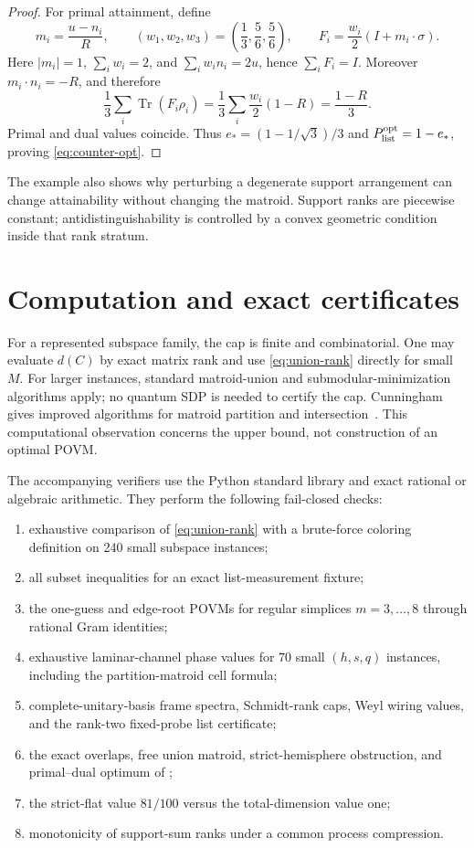 \documentclass[11pt]{article}
\theoremstyle{definition}
\theoremstyle{remark}
\newcommand{\Tr}{\operatorname{Tr}}
\begin{document}
\begin{proof}
For primal attainment, define
\[
 m_i=\frac{u-n_i}{R},\qquad
 (w_1,w_2,w_3)=\left(\frac13,\frac56,\frac56\right),
 \qquad F_i=\frac{w_i}{2}(I+m_i\cdot\sigma).
\]
Here $|m_i|=1$, $\sum_iw_i=2$, and
$\sum_iw_in_i=2u$, hence $\sum_iF_i=I$.  Moreover
$m_i\cdot n_i=-R$, and therefore
\[
 \frac13\sum_i\Tr(F_i\rho_i)
 =\frac13\sum_i\frac{w_i}{2}(1-R)
 =\frac{1-R}{3}.
\]
Primal and dual values coincide.  Thus
$e_*=(1-1/\sqrt3)/3$ and $P_{\rm list}^{\rm opt}=1-e_*$, proving
\eqref{eq:counter-opt}.
\end{proof}

The example also shows why perturbing a degenerate support arrangement can
change attainability without changing the matroid.  Support ranks are
piecewise constant; antidistinguishability is controlled by a convex
geometric condition inside that rank stratum.

\section{Computation and exact certificates}\label{sec:computation}

For a represented subspace family, the cap is finite and combinatorial.  One
may evaluate $d(C)$ by exact matrix rank and use
\eqref{eq:union-rank} directly for small $M$.  For larger instances, standard
matroid-union and submodular-minimization algorithms apply; no quantum SDP is
needed to certify the cap.  Cunningham gives improved algorithms for matroid
partition and intersection~\cite{cunningham1986}.  This computational
observation concerns the upper bound, not construction of an optimal POVM.

The accompanying verifiers use the Python standard library and exact rational
or algebraic arithmetic.  They perform the following fail-closed checks:

\begin{enumerate}
 \item exhaustive comparison of \eqref{eq:union-rank} with a brute-force
       coloring definition on 240 small subspace instances;
 \item all subset inequalities for an exact list-measurement fixture;
 \item the one-guess and edge-root POVMs for regular simplices
       $m=3,\ldots,8$ through rational Gram identities;
 \item exhaustive laminar-channel phase values for $70$ small
       $(h,s,q)$ instances, including the partition-matroid cell formula;
 \item complete-unitary-basis frame spectra, Schmidt-rank caps, Weyl wiring
       values, and the rank-two fixed-probe list certificate;
 \item the exact overlaps, free union matroid, strict-hemisphere obstruction,
       and primal--dual optimum of ;
 \item the strict-flat value $81/100$ versus the total-dimension value one;
 \item monotonicity of support-sum ranks under a common process compression.
\end{enumerate}
\end{document}
